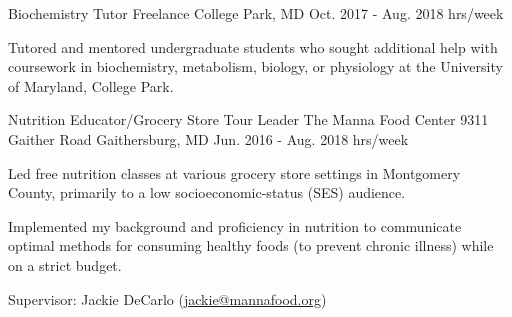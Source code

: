 \begin{cventries}
  \cventry
    {Biochemistry Tutor} %
    {Freelance} %
    {College Park, MD} %
    {Oct. 2017 - Aug. 2018  hrs/week} %
    {
      \begin{cvitems} %
        \item {Tutored and mentored undergraduate students who sought additional help with coursework in biochemistry, metabolism, biology, or physiology at the University of Maryland, College Park.}
      \end{cvitems}
    }


  \cventry
    {Nutrition Educator/Grocery Store Tour Leader } %
    {The Manna Food Center } %
    {9311 Gaither Road \newline
Gaithersburg, MD} %
    {Jun. 2016 - Aug. 2018  hrs/week} %
    {
      \begin{cvitems} %
        \item {Led free nutrition classes at various grocery store settings in Montgomery County, primarily to a low socioeconomic-status (SES) audience.}
        \item {Implemented my background and proficiency in nutrition to communicate optimal methods for consuming healthy foods (to prevent chronic illness) while on a strict budget.}
        \item {Supervisor: Jackie DeCarlo (\textcolor{navyblue}{\underline{\href{mailto:jackie@mannafood.org}{jackie@mannafood.org}}})}
      \end{cvitems}
    }



\end{cventries}
